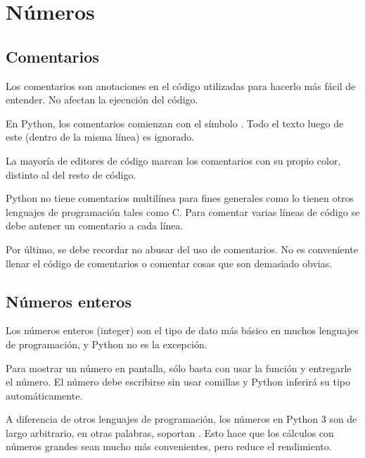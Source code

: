 \chapter{Números}

\section{Comentarios}

Los comentarios son anotaciones en el código utilizadas para hacerlo más fácil de entender.
No afectan la ejecución del código.
\medskip

En Python, los comentarios comienzan con el símbolo \ttt{\#}.
Todo el texto luego de este \ttt{\#} (dentro de la misma línea) es ignorado.


La mayoría de editores de código marcan los comentarios con su propio color, distinto al del resto de código.


Python no tiene comentarios multilínea para fines generales como lo tienen otros lenguajes de programación tales como C.
Para comentar varias líneas de código se debe antener un comentario a cada línea.


Por último, se debe recordar no abusar del uso de comentarios.
No es conveniente llenar el código de comentarios o comentar cosas que son demasiado obvias.


\section{Números enteros}

Los números enteros (integer) son el tipo de dato más básico en muchos lenguajes de programación, y Python no es la excepción.
\medskip

Para mostrar un número en pantalla, sólo basta con usar la función  y entregarle el número.
El número debe escribirse sin usar comillas y Python inferirá su tipo automáticamente.


A diferencia de otros lenguajes de programación, los números en Python 3 son de largo arbitrario, en otras palabras, soportan .
Esto hace que los cálculos con números grandes sean mucho más convenientes, pero reduce el rendimiento.

